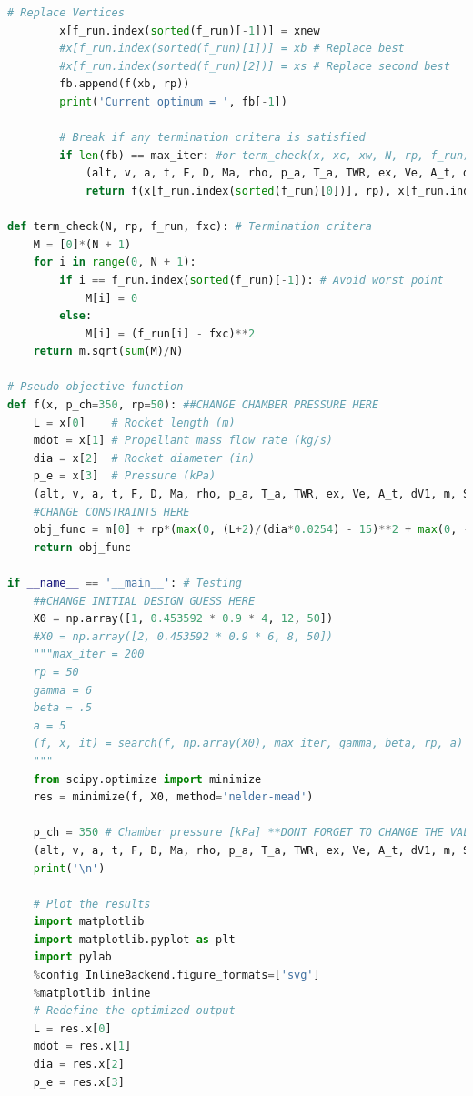 \documentclass[]{aiaa-tc}%
\begin{document}
\begin{lstlisting}[language=Python]
        # Replace Vertices
        x[f_run.index(sorted(f_run)[-1])] = xnew
        #x[f_run.index(sorted(f_run)[1])] = xb # Replace best
        #x[f_run.index(sorted(f_run)[2])] = xs # Replace second best
        fb.append(f(xb, rp))
        print('Current optimum = ', fb[-1])
        
        # Break if any termination critera is satisfied
        if len(fb) == max_iter: #or term_check(x, xc, xw, N, rp, f_run) <= epsilon:
            (alt, v, a, t, F, D, Ma, rho, p_a, T_a, TWR, ex, Ve, A_t, dV1, m, S_crit, q, m_prop, p_ch) = trajectory(xb[0], xb[1], xb[2], xb[3])
            return f(x[f_run.index(sorted(f_run)[0])], rp), x[f_run.index(sorted(f_run)[0])], len(fb)
        
def term_check(N, rp, f_run, fxc): # Termination critera
    M = [0]*(N + 1)
    for i in range(0, N + 1):
        if i == f_run.index(sorted(f_run)[-1]): # Avoid worst point
            M[i] = 0
        else:
            M[i] = (f_run[i] - fxc)**2
    return m.sqrt(sum(M)/N)
        
# Pseudo-objective function
def f(x, p_ch=350, rp=50): ##CHANGE CHAMBER PRESSURE HERE
    L = x[0]    # Rocket length (m)
    mdot = x[1] # Propellant mass flow rate (kg/s)
    dia = x[2]  # Rocket diameter (in)
    p_e = x[3]  # Pressure (kPa)
    (alt, v, a, t, F, D, Ma, rho, p_a, T_a, TWR, ex, Ve, A_t, dV1, m, S_crit, q, m_prop) = trajectory(L, mdot, dia, p_e, p_ch)
    #CHANGE CONSTRAINTS HERE
    obj_func = m[0] + rp*(max(0, (L+2)/(dia*0.0254) - 15)**2 + max(0, -TWR + 2)**2 + max(0, -S_crit + 0.35)**2 + max(0, -alt[-1] + 100000)**2 + max(0, max(abs(a))/9.81 - 15)**2)   
    return obj_func

if __name__ == '__main__': # Testing
    ##CHANGE INITIAL DESIGN GUESS HERE
    X0 = np.array([1, 0.453592 * 0.9 * 4, 12, 50])
    #X0 = np.array([2, 0.453592 * 0.9 * 6, 8, 50])
    """max_iter = 200
    rp = 50
    gamma = 6
    beta = .5
    a = 5
    (f, x, it) = search(f, np.array(X0), max_iter, gamma, beta, rp, a)
    """
    from scipy.optimize import minimize
    res = minimize(f, X0, method='nelder-mead')    
    
    p_ch = 350 # Chamber pressure [kPa] **DONT FORGET TO CHANGE THE VALUE IN THE OBJECTIVE FUNCTION IN def f()**
    (alt, v, a, t, F, D, Ma, rho, p_a, T_a, TWR, ex, Ve, A_t, dV1, m, S_crit, q, m_prop) = trajectory(res.x[0], res.x[1], res.x[2], res.x[3], p_ch)   
    print('\n')
    
    # Plot the results
    import matplotlib
    import matplotlib.pyplot as plt
    import pylab
    %config InlineBackend.figure_formats=['svg']
    %matplotlib inline
    # Redefine the optimized output
    L = res.x[0]    
    mdot = res.x[1]
    dia = res.x[2]
    p_e = res.x[3]
    

\end{lstlisting}
\end{document}
